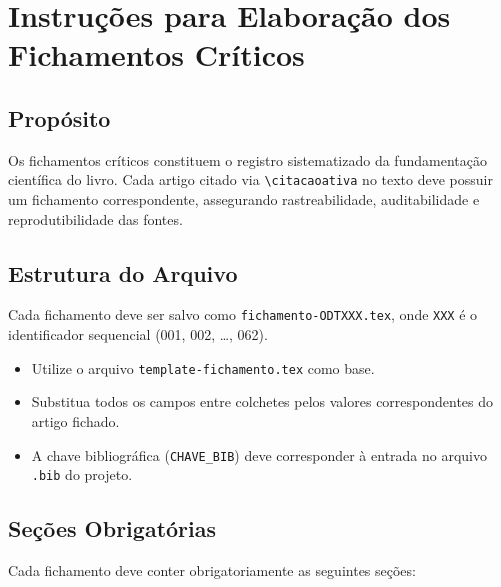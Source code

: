 
\chapter*{Instruções para Elaboração dos Fichamentos Críticos}

\section*{Propósito}
Os fichamentos críticos constituem o registro sistematizado da fundamentação
científica do livro. Cada artigo citado via \texttt{\textbackslash citacaoativa}
no texto deve possuir um fichamento correspondente, assegurando
rastreabilidade, auditabilidade e reprodutibilidade das fontes.

\section*{Estrutura do Arquivo}
Cada fichamento deve ser salvo como \texttt{fichamento-ODTXXX.tex}, onde
\texttt{XXX} é o identificador sequencial (001, 002, \ldots, 062).
\begin{itemize}
  \item Utilize o arquivo \texttt{template-fichamento.tex} como base.
  \item Substitua todos os campos entre colchetes pelos valores
        correspondentes do artigo fichado.
  \item A chave bibliográfica (\texttt{CHAVE\_BIB}) deve corresponder à
        entrada no arquivo \texttt{.bib} do projeto.
\end{itemize}

\section*{Seções Obrigatórias}
Cada fichamento deve conter obrigatoriamente as seguintes seções:


